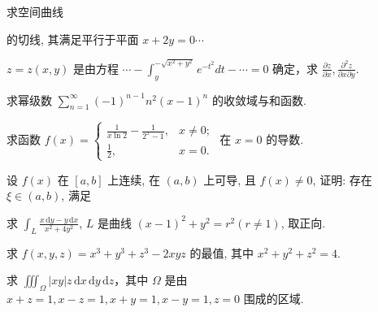 \par{}
求空间曲线\par
\nopagebreak[4]
的切线, 其满足平行于平面  $x + 2y = 0 \cdots$\par
$z = z(x, y)$  是由方程  $\cdots - \int_{y}^{-\sqrt{x^{2} + y^{2}}} e^{-t^{2}} dt - \cdots = 0$  确定，求  $\frac{\partial z}{\partial x}, \frac{\partial^{2}z}{\partial x \partial y}.$\par
求幂级数 $\sum_{n=1}^{\infty} (-1)^{n-1} n^2 (x - 1)^n$ 的收敛域与和函数.\par
求函数 $f(x) = \begin{cases} \frac{1}{x\ln 2} - \frac{1}{2^x - 1}, & x \neq 0; \\ \frac{1}{2}, & x = 0. \end{cases}$ 在 $x = 0$ 的导数.\par
\par{}
设 $f(x)$ 在 $[a, b]$ 上连续, 在 $(a, b)$ 上可导, 且 $f(x) \neq 0$, 证明: 存在 $\xi \in (a, b)$, 满足\par
\nopagebreak[4]
求 $\int_{L} \frac{x \, \mathrm{d}y - y \, \mathrm{d}x}{x^{2} + 4y^{2}}$, $L$ 是曲线 $(x - 1)^{2} + y^{2} = r^{2} (r \neq 1)$, 取正向.\par
求 $f(x, y, z) = x^3 + y^3 + z^3 - 2xyz$ 的最值, 其中 $x^2 + y^2 + z^2 = 4$.\par
求 $\iiint_{\Omega} |xy| z \, \mathrm{d}x \, \mathrm{d}y \, \mathrm{d}z$，其中 $\Omega$ 是由 $x + z = 1, x - z = 1, x + y = 1, x - y = 1, z = 0$ 围成的区域.\par
